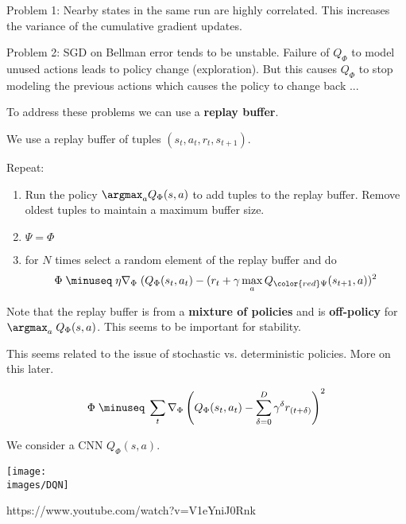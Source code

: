 {Problem 1: Nearby states in the same run are highly correlated.  This increases the variance of the cumulative gradient updates.

\vfill
Problem 2: SGD on Bellman error tends to be unstable. Failure of $Q_\Phi$ to model unused actions leads to policy change (exploration).
But this causes $Q_\Phi$ to stop modeling the previous actions
which causes the policy to change back ...

\vfill
To address these problems we can use a {\bf replay buffer}.


We use a replay buffer of tuples $(s_t,a_t,r_t,s_{t+1})$.

\vfill
Repeat:

\vfill
\begin{enumerate}

\item Run the policy $\argmax_a Q_\Phi(s,a)$ to add tuples to the replay buffer.  Remove oldest tuples to maintain a maximum buffer size.

\item {\color{red} $\Psi = \Phi$}
  
\item for $N$ times select a random element of the replay buffer and do
$$\Phi \;\minuseq \; \eta \nabla_\Phi\;(Q_\Phi(s_t,a_t) - (r_t + \gamma \max_{a} Q_{\color{red} \Psi}(s_{t+1},a))^2$$
\end{enumerate}


Note that the replay buffer is from a {\bf mixture of policies} and is {\bf off-policy} for $\argmax_a\;Q_\Phi(s,a)$.  This seems to be important for stability.

\vfill
This seems related to the issue of stochastic vs. deterministic policies.  More on this later.


$$\Phi \;\minuseq \;\sum_t \nabla_\Phi \left(Q_\Phi(s_t,a_t) - \sum_{\delta = 0}^{D} \gamma^\delta r_{(t+\delta)}\right)^2$$

\vfill
We consider a CNN $Q_\Phi(s,a)$.

\vfill
\centerline{\texttt{[image: \\images/DQN]}}


https://www.youtube.com/watch?v=V1eYniJ0Rnk

}
